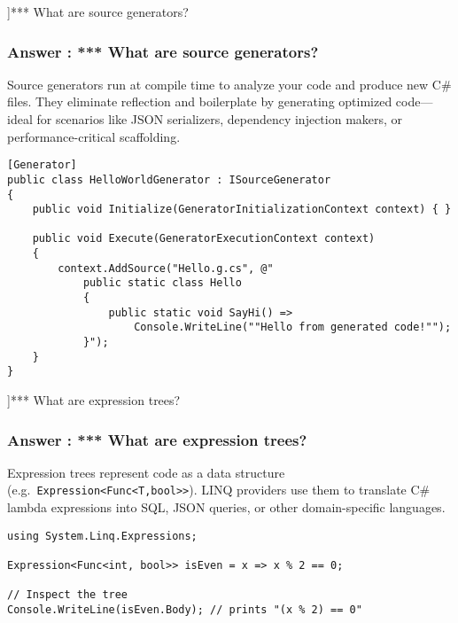\QuestionSlide[\CategoryBadge[MetaColor!20]{Metaprogramming}]{*** What are source generators?}
\begin{frame}[fragile]
  \frametitle{Answer \theqcounter: *** What are source generators?}


  {\footnotesize
    Source generators run at compile time to analyze your code and produce new C\# files. They eliminate reflection and boilerplate by generating optimized code—ideal for scenarios like JSON serializers, dependency injection makers, or performance-critical scaffolding.
  }

  \begin{verbatim}
[Generator]
public class HelloWorldGenerator : ISourceGenerator
{
    public void Initialize(GeneratorInitializationContext context) { }

    public void Execute(GeneratorExecutionContext context)
    {
        context.AddSource("Hello.g.cs", @"
            public static class Hello
            {
                public static void SayHi() =>
                    Console.WriteLine(""Hello from generated code!"");
            }");
    }
}
  \end{verbatim}
\end{frame}

\QuestionSlide[\CategoryBadge[MetaColor!20]{Metaprogramming}]{*** What are expression trees?}
\begin{frame}[fragile]
  \frametitle{Answer \theqcounter: *** What are expression trees?}


  {\footnotesize
    Expression trees represent code as a data structure (e.g.\ \texttt{Expression<Func<T,bool>>}). LINQ providers use them to translate C\# lambda expressions into SQL, JSON queries, or other domain-specific languages.
  }

  \begin{verbatim}
using System.Linq.Expressions;

Expression<Func<int, bool>> isEven = x => x % 2 == 0;

// Inspect the tree
Console.WriteLine(isEven.Body); // prints "(x % 2) == 0"
  \end{verbatim}
\end{frame}
